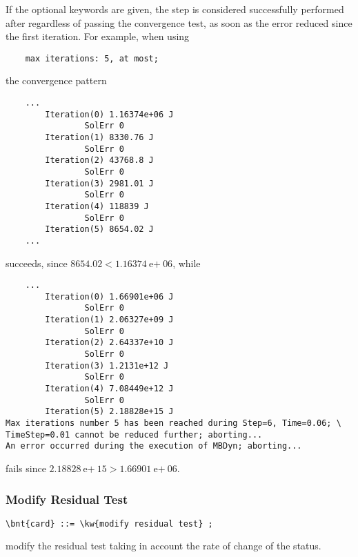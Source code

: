 If the optional keywords  are given,
the step is considered successfully performed after 
regardless of passing the convergence test, as soon as the error
reduced since the first iteration.
For example, when using
\begin{verbatim}
    max iterations: 5, at most;
\end{verbatim}
the convergence pattern
\begin{verbatim}
    ...
        Iteration(0) 1.16374e+06 J
                SolErr 0
        Iteration(1) 8330.76 J
                SolErr 0
        Iteration(2) 43768.8 J
                SolErr 0
        Iteration(3) 2981.01 J
                SolErr 0
        Iteration(4) 118839 J
                SolErr 0
        Iteration(5) 8654.02 J
    ...
\end{verbatim}
succeeds, since $8654.02 < 1.16374\text{e$+$}06$, while
\begin{verbatim}
    ...
        Iteration(0) 1.66901e+06 J
                SolErr 0
        Iteration(1) 2.06327e+09 J
                SolErr 0
        Iteration(2) 2.64337e+10 J
                SolErr 0
        Iteration(3) 1.2131e+12 J
                SolErr 0
        Iteration(4) 7.08449e+12 J
                SolErr 0
        Iteration(5) 2.18828e+15 J
Max iterations number 5 has been reached during Step=6, Time=0.06; \
TimeStep=0.01 cannot be reduced further; aborting...
An error occurred during the execution of MBDyn; aborting... 
\end{verbatim}
fails since $2.18828\text{e$+$}15 > 1.66901\text{e$+$}06$.


\subsubsection{Modify Residual Test}
\begin{Verbatim}[commandchars=\\\{\}]
    \bnt{card} ::= \kw{modify residual test} ;
\end{Verbatim}
modify the residual test taking in account the rate of change of the status.

